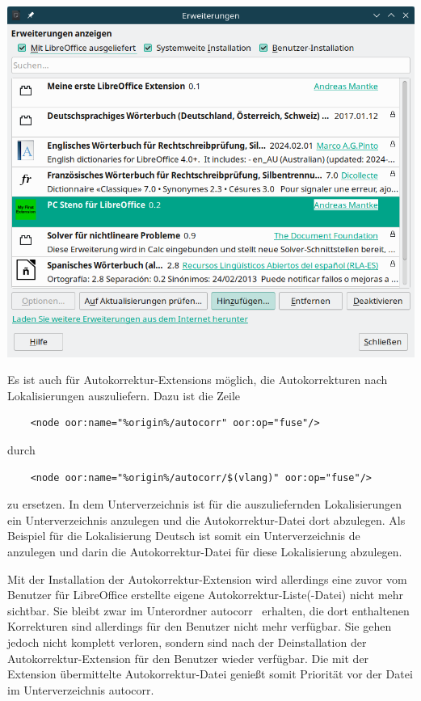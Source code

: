 \documentclass[12pt,a4paper,titlepage]{book}
\begin{document}
\begin{center}
	\captionsetup{type=figure}
	\includegraphics[width=0.9\linewidth]{pics/libo24_2_extensionmanager_autocorrect_extension_installed01}
	\label{fig:autocorr_extension_extension_manager}
\end{center}



Es ist auch für Autokorrektur-Extensions möglich, die Autokorrekturen nach Lokalisierungen auszuliefern. Dazu ist die Zeile
\begin{lstlisting}
	<node oor:name="%origin%/autocorr" oor:op="fuse"/>
\end{lstlisting}

durch
\begin{lstlisting}
	<node oor:name="%origin%/autocorr/$(vlang)" oor:op="fuse"/>
\end{lstlisting}

zu ersetzen. In dem Unterverzeichnis ist für die auszuliefernden Lokalisierungen ein Unterverzeichnis anzulegen und die Autokorrektur-Datei dort abzulegen. Als Beispiel für die Lokalisierung Deutsch ist somit ein Unterverzeichnis \glqq de\grqq~ anzulegen und darin die Autokorrektur-Datei für diese Lokalisierung abzulegen.

Mit der Installation der Autokorrektur-Extension wird allerdings eine zuvor vom Benutzer für LibreOffice erstellte eigene Autokorrektur-Liste(-Datei) nicht mehr sichtbar. Sie bleibt zwar im Unterordner \glqq autocorr\grqq~ erhalten, die dort enthaltenen Korrekturen sind allerdings für den Benutzer nicht mehr verfügbar. Sie gehen jedoch nicht komplett verloren, sondern sind nach der Deinstallation der Autokorrektur-Extension für den Benutzer wieder verfügbar. Die mit der Extension übermittelte Autokorrektur-Datei genießt somit Priorität vor der Datei im Unterverzeichnis \glqq autocorr\grqq.
\end{document}
